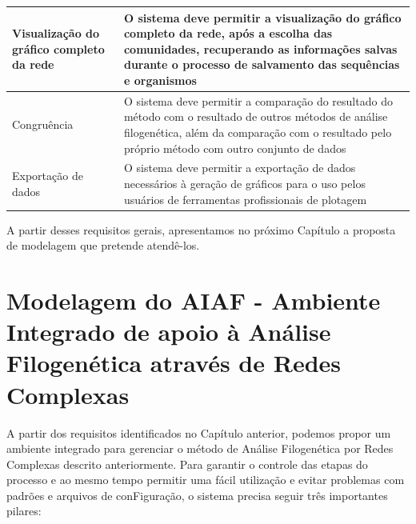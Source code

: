 \begin{table}
\begin{tabular}{p{5cm}p{10cm}}
Visualização do gráfico completo da rede & O sistema deve permitir a visualização do gráfico completo da rede, após a escolha das comunidades,
recuperando as informações salvas durante o processo de salvamento das sequências e organismos \\ \hline
Congruência & O sistema deve permitir a comparação do resultado do método com o resultado de outros métodos de análise filogenética, além da comparação
com o resultado pelo próprio método com outro conjunto de dados \\ \hline
Exportação de dados & O sistema deve permitir a exportação de dados necessários à geração de gráficos para o uso pelos usuários de ferramentas
profissionais de plotagem \\ \hline
\end{tabular}
\label{tab:requisitos}
\end{table} 

A partir desses requisitos gerais, apresentamos no próximo Capítulo a proposta de modelagem que pretende atendê-los.


\chapter{Modelagem do AIAF - Ambiente Integrado de apoio à Análise Filogenética através de Redes Complexas}
\label{cap:navi}


A partir dos requisitos identificados no Capítulo anterior, podemos propor um ambiente integrado para gerenciar o método de Análise Filogenética por
Redes Complexas descrito anteriormente. Para garantir o controle das etapas do processo e ao mesmo tempo permitir uma fácil utilização e evitar problemas
com padrões e arquivos de conFiguração, o sistema precisa seguir três importantes pilares:

